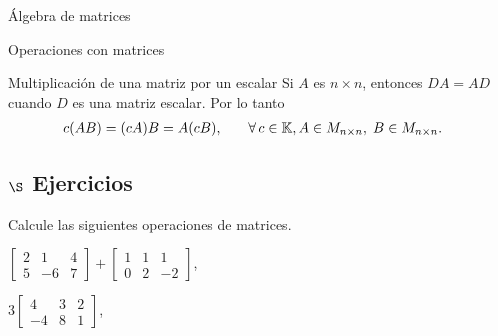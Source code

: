 \begin{chapter}{\'Algebra de matrices}
\begin{section}{Operaciones con matrices}
\begin{subsection}{Multiplicaci\'on de una matriz por un escalar}
            Si $A$ es $n \times n$,  entonces $DA = AD$ cuando $D$  es una matriz escalar. Por lo tanto
            \begin{align*}
            c(A B) = (cA) B = A(cB),\qquad &\forall\, c \in \mathbb K,  A \in M_{n \times n}, \;B \in M_{n \times n}.
            \end{align*} 

        \end{subsection}
            
        \subsection*{$\S$ Ejercicios}
        \begin{enumex}
            \item Calcule las siguientes operaciones de matrices.
                \begin{enumex}
                    \begin{minipage}{0.45\textwidth}
                    \item $\begin{bmatrix} 2&1&4\\5&-6&7 \end{bmatrix}+
                    \begin{bmatrix} 1&1&1\\0&2&-2 \end{bmatrix}$,
                    \end{minipage}
                    \begin{minipage}{0.4\textwidth}
                    \item $3 \begin{bmatrix}
                        4&3&2\\-4&8&1
                    \end{bmatrix}$,
                    \end{minipage}


\end{enumex}
\end{enumex}
\end{section}
\end{chapter}
